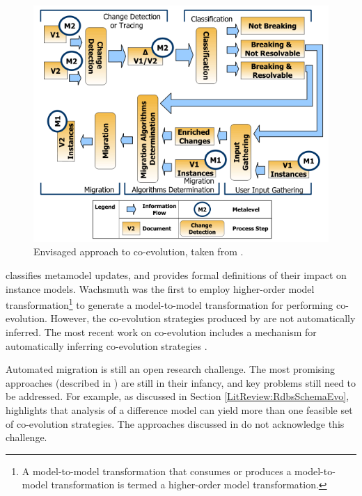 \begin{figure}[htbp]
  \begin{center}
    \leavevmode
    \includegraphics[scale=0.6]{3.LiteratureReview/CoEvoProcess.png}
  \end{center}
  \caption{Envisaged approach to co-evolution, taken from \cite{gruschko07towards}.}
  \label{fig:coevoprocess}
\end{figure}

\cite{wachsmuth07metamodel} classifies metamodel updates, and provides formal definitions of their impact on instance models. Wachsmuth was the first to employ higher-order model transformation\footnote{A model-to-model transformation that consumes or produces a model-to-model transformation is termed a higher-order model transformation.} to generate a model-to-model transformation for performing co-evolution. However, the co-evolution strategies produced by \cite{wachsmuth07metamodel} are not automatically inferred. The most recent work on co-evolution includes a mechanism for automatically inferring co-evolution strategies \cite{cicchetti08automating}.

Automated migration is still an open research challenge. The most promising approaches (described in \cite{wachsmuth07metamodel,cicchetti08automating}) are still in their infancy, and key problems still need to be addressed. For example, as discussed in Section \ref{LitReview:RdbsSchemaEvo}, \cite{lerner00model} highlights that analysis of a difference model can yield more than one feasible set of co-evolution strategies. The approaches discussed in \cite{wachsmuth07metamodel,cicchetti08automating} do not acknowledge this challenge.

